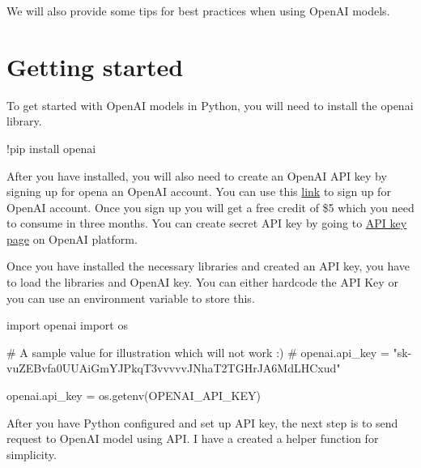\documentclass[
  letterpaper,
  DIV=11,
  numbers=noendperiod]{scrreprt}
\newenvironment{Shaded}{\begin{snugshade}}{\end{snugshade}}
\newcommand{\CommentTok}[1]{\textcolor[rgb]{0.37,0.37,0.37}{#1}}
\newcommand{\ImportTok}[1]{\textcolor[rgb]{0.00,0.46,0.62}{#1}}
\newcommand{\NormalTok}[1]{\textcolor[rgb]{0.00,0.23,0.31}{#1}}
\newcommand{\OperatorTok}[1]{\textcolor[rgb]{0.37,0.37,0.37}{#1}}
\newcommand{\StringTok}[1]{\textcolor[rgb]{0.13,0.47,0.30}{#1}}
\begin{document}
We will also provide some tips for best practices when using OpenAI
models.

\hypertarget{getting-started}{%
\section{Getting started}\label{getting-started}}

To get started with OpenAI models in Python, you will need to install
the openai library.

\begin{Shaded}
\begin{Highlighting}[]
\OperatorTok{!}\NormalTok{pip install openai}
\end{Highlighting}
\end{Shaded}

After you have installed, you will also need to create an OpenAI API key
by signing up for opena an OpenAI account. You can use this
\href{https://platform.openai.com/}{link} to sign up for OpenAI account.
Once you sign up you will get a free credit of \$5 which you need to
consume in three months. You can create secret API key by going to
\href{https://platform.openai.com/account/api-keys}{API key page} on
OpenAI platform.

Once you have installed the necessary libraries and created an API key,
you have to load the libraries and OpenAI key. You can either hardcode
the API Key or you can use an environment variable to store this.

\begin{Shaded}
\begin{Highlighting}[]
\ImportTok{import}\NormalTok{ openai}
\ImportTok{import}\NormalTok{ os}

\CommentTok{\# A sample value for illustration which will not work :)}
\CommentTok{\# openai.api\_key  = "sk{-}vuZEBvfa0UUAiGmYJPkqT3vvvvvJNhaT2TGHrJA6MdLHCxud" }

\NormalTok{openai.api\_key  }\OperatorTok{=}\NormalTok{ os.getenv(}\StringTok{\textquotesingle{}OPENAI\_API\_KEY\textquotesingle{}}\NormalTok{)}
\end{Highlighting}
\end{Shaded}

After you have Python configured and set up API key, the next step is to
send request to OpenAI model using API. I have a created a helper
function for simplicity.
\end{document}
